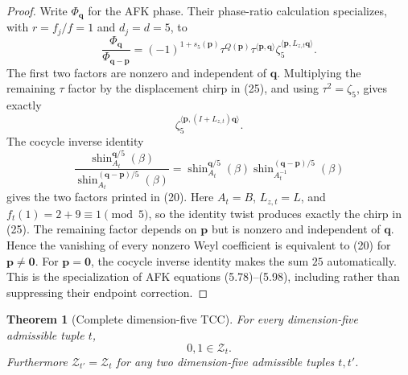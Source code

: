 \documentclass[11pt]{article}
\newtheorem{theorem}{Theorem}
\begin{document}
\begin{proof}
Write $\Phi_{\boldsymbol q}$ for the AFK phase.  Their phase-ratio
calculation specializes, with $r=f_j/f=1$ and $d_j=d=5$, to
\[
 \frac{\Phi_{\boldsymbol q}}
 {\Phi_{\boldsymbol q-\boldsymbol p}}
 =
 (-1)^{1+s_5(\boldsymbol p)}
 \tau^{Q(\boldsymbol p)}
 \tau^{\langle\boldsymbol p,\boldsymbol q\rangle}
 \zeta_5^{\langle\boldsymbol p,L_{z,t}\boldsymbol q\rangle}.
\tag{26}
\]
The first two factors are nonzero and independent of
$\boldsymbol q$.  Multiplying the remaining $\tau$ factor by the
displacement chirp in (25), and using $\tau^2=\zeta_5$, gives exactly
\[
 \zeta_5^{\langle\boldsymbol p,
 (I+L_{z,t})\boldsymbol q\rangle}.
\]
The cocycle inverse identity
\[
 \frac{\operatorname{shin}_{A_t}^{\boldsymbol q/5}(\beta)}
 {\operatorname{shin}_{A_t}^{(\boldsymbol q-\boldsymbol p)/5}(\beta)}
 =
 \operatorname{shin}_{A_t}^{\boldsymbol q/5}(\beta)
 \operatorname{shin}_{A_t^{-1}}^{
   (\boldsymbol q-\boldsymbol p)/5}(\beta)
\tag{27}
\]
gives the two factors printed in (20).  Here
$A_t=B$, $L_{z,t}=L$, and
$f_t(1)=2+9\equiv1\pmod5$, so the identity twist produces exactly the
chirp in (25).  The remaining factor depends on
$\boldsymbol p$ but is nonzero and independent of
$\boldsymbol q$.  Hence the vanishing of every nonzero Weyl coefficient
is equivalent to (20) for $\boldsymbol p\ne\boldsymbol0$.
For $\boldsymbol p=\boldsymbol0$, the cocycle inverse identity makes
the sum $25$ automatically.  This is the specialization of AFK
equations (5.78)--(5.98), including rather than suppressing their
endpoint correction.
\end{proof}

\begin{theorem}[Complete dimension-five TCC]\label{thm:tcc}
For every dimension-five admissible tuple $t$,
\[
 0,1\in\mathcal Z_t.
\]
Furthermore $\mathcal Z_{t'}=\mathcal Z_t$ for any two dimension-five
admissible tuples $t,t'$.
\end{theorem}
\end{document}
